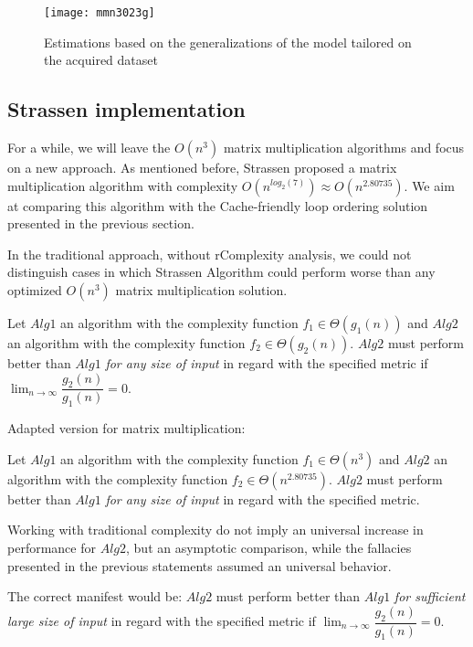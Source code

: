 \begin{figure}[H]
\centering
\texttt{[image: mmn3023g]}
\caption{Estimations based on the generalizations of the model tailored on the acquired dataset}
\end{figure}

\subsection{Strassen implementation}

For a while, we will leave the $O(n^3)$ matrix multiplication algorithms and focus on a new approach. As mentioned before, Strassen proposed a matrix multiplication algorithm with complexity $O(n^{log_{2}(7)}) \approx O(n^{2.80735})$. We aim at comparing this algorithm with the Cache-friendly loop ordering solution presented in the previous section.

In the traditional approach, without rComplexity analysis, we could not distinguish cases in which Strassen Algorithm could perform worse than any optimized $O(n^3)$ matrix multiplication solution.


\begin{fallacy}
Let $Alg1$ an algorithm with the complexity function $f_{1} \in \Theta(g_1(n))$  and $Alg2$ an algorithm with the complexity function $f_{2} \in \Theta(g_2(n))$. $Alg2$ must perform better than $Alg1$ \textit{for any size of input} in regard with the specified metric if $\lim_{n\to\infty} \dfrac{g_2(n)}{g_1(n)} = 0$.
\end{fallacy}


\begin{fallacy}
Adapted version for matrix multiplication:

Let $Alg1$ an algorithm with the complexity function $f_{1} \in \Theta(n^3)$  and $Alg2$ an algorithm with the complexity function $f_{2} \in \Theta(n^{2.80735})$. $Alg2$ must perform better than $Alg1$ \textit{for any size of input} in regard with the specified metric.
\end{fallacy}

Working with traditional complexity do not imply an universal increase in performance for $Alg2$, but an asymptotic comparison, while the fallacies presented in the previous statements assumed an universal behavior.

The correct manifest would be: $Alg2$ must perform better than $Alg1$ \textit{for sufficient large size of input} in regard with the specified metric if $\lim_{n\to\infty} \dfrac{g_2(n)}{g_1(n)} = 0$.

